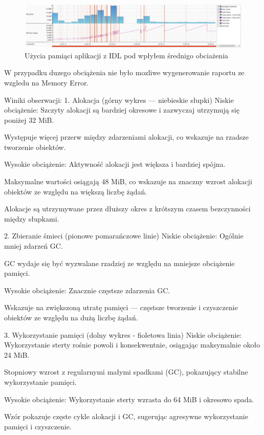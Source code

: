 \documentclass[runningheads,12pt]{llncs}
\begin{document}
\begin{figure}
    \includegraphics[width=\linewidth]{images/idl-memory-low-graph.jpg}
    \caption{Użycia pamiąci aplikacji z IDL pod wpłyłem średnigo obciażenia} \label{fig1}
\end{figure}

W przypadku duzego obciążenia nie było mozliwe wygenerowanie raportu ze wzgledu na Memory Error.

\newpage

Winiki obserwacji:
1. Alokacja (górny wykres — niebieskie słupki)
Niskie obciążenie:
Szczyty alokacji są bardziej okresowe i zazwyczaj utrzymują się poniżej 32 MiB.

Występuje więcej przerw między zdarzeniami alokacji, co wskazuje na rzadsze tworzenie obiektów.

Wysokie obciążenie:
Aktywność alokacji jest większa i bardziej spójna.

Maksymalne wartości osiągają 48 MiB, co wskazuje na znaczny wzrost alokacji obiektów ze względu na większą liczbę żądań.

Alokacje są utrzymywane przez dłuższy okres z krótszym czasem bezczynności między słupkami.

2. Zbieranie śmieci (pionowe pomarańczowe linie)
Niskie obciążenie:
Ogólnie mniej zdarzeń GC.

GC wydaje się być wyzwalane rzadziej ze względu na mniejsze obciążenie pamięci.

Wysokie obciążenie:
Znacznie częstsze zdarzenia GC.

Wskazuje na zwiększoną utratę pamięci — częstsze tworzenie i czyszczenie obiektów ze względu na dużą liczbę żądań.

3. Wykorzystanie pamięci (dolny wykres - fioletowa linia)
Niskie obciążenie:
Wykorzystanie sterty rośnie powoli i konsekwentnie, osiągając maksymalnie około 24 MiB.

Stopniowy wzrost z regularnymi małymi spadkami (GC), pokazujący stabilne wykorzystanie pamięci.

Wysokie obciążenie:
Wykorzystanie sterty wzrasta do 64 MiB i okresowo spada.

Wzór pokazuje częste cykle alokacji i GC, sugerując agresywne wykorzystanie pamięci i czyszczenie.
\end{document}
